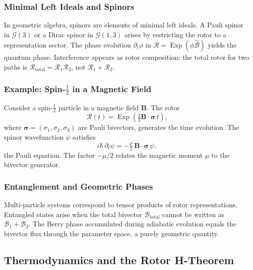 \documentclass[11pt,a4paper]{article}
\newcommand{\Exp}{\operatorname{Exp}}
\newcommand{\Rotor}{\mathcal{R}}
\newcommand{\Biv}{\mathcal{B}}
\theoremstyle{definition}
\theoremstyle{plain}
\theoremstyle{remark}
\begin{document}
\subsubsection{Minimal Left Ideals and Spinors}

In geometric algebra, spinors are elements of minimal left ideals. A Pauli spinor in $\mathcal{G}(3)$ or a Dirac spinor in $\mathcal{G}(1,3)$ arises by restricting the rotor to a representation sector. The phase evolution $\partial_t \phi$ in $\Rotor = \Exp(\phi\hat{\Biv})$ yields the quantum phase. Interference appears as rotor composition: the total rotor for two paths is $\Rotor_{\text{total}} = \Rotor_1 \Rotor_2$, not $\Rotor_1 + \Rotor_2$.

\subsubsection{Example: Spin-$\tfrac{1}{2}$ in a Magnetic Field}

Consider a spin-$\tfrac{1}{2}$ particle in a magnetic field $\mathbf{B}$. The rotor
\begin{equation}
\Rotor(t) = \Exp\!\left(\tfrac{1}{2}\mathbf{B}\cdot\bm{\sigma}\, t\right),
\end{equation}
where $\bm{\sigma} = (\sigma_1, \sigma_2, \sigma_3)$ are Pauli bivectors, generates the time evolution. The spinor wavefunction $\psi$ satisfies
\begin{equation}
i\hbar\, \partial_t \psi = -\tfrac{\mu}{2}\, \mathbf{B}\cdot\bm{\sigma}\, \psi,
\end{equation}
the Pauli equation. The factor $-\mu/2$ relates the magnetic moment $\mu$ to the bivector generator.

\subsubsection{Entanglement and Geometric Phases}

Multi-particle systems correspond to tensor products of rotor representations. Entangled states arise when the total bivector $\Biv_{\text{total}}$ cannot be written as $\Biv_1 + \Biv_2$. The Berry phase accumulated during adiabatic evolution equals the bivector flux through the parameter space, a purely geometric quantity.

\subsection{Thermodynamics and the Rotor H-Theorem}
\end{document}
